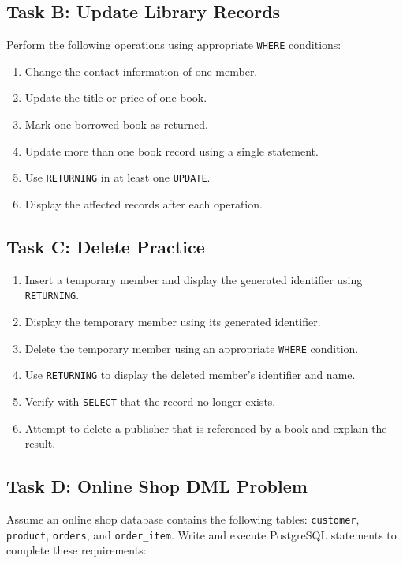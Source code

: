 \documentclass[12pt,a4paper]{article}
\begin{document}
\subsection*{Task B: Update Library Records}
Perform the following operations using appropriate \texttt{WHERE} conditions:

\begin{enumerate}
    \item Change the contact information of one member.
    \item Update the title or price of one book.
    \item Mark one borrowed book as returned.
    \item Update more than one book record using a single statement.
    \item Use \texttt{RETURNING} in at least one \texttt{UPDATE}.
    \item Display the affected records after each operation.
\end{enumerate}

\subsection*{Task C: Delete Practice}
\begin{enumerate}
    \item Insert a temporary member and display the generated identifier using \texttt{RETURNING}.
    \item Display the temporary member using its generated identifier.
    \item Delete the temporary member using an appropriate \texttt{WHERE} condition.
    \item Use \texttt{RETURNING} to display the deleted member's identifier and name.
    \item Verify with \texttt{SELECT} that the record no longer exists.
    \item Attempt to delete a publisher that is referenced by a book and explain the result.
\end{enumerate}

\subsection*{Task D: Online Shop DML Problem}
Assume an online shop database contains the following tables:
\texttt{customer}, \texttt{product}, \texttt{orders}, and \texttt{order\_item}.
Write and execute PostgreSQL statements to complete these requirements:
\end{document}
